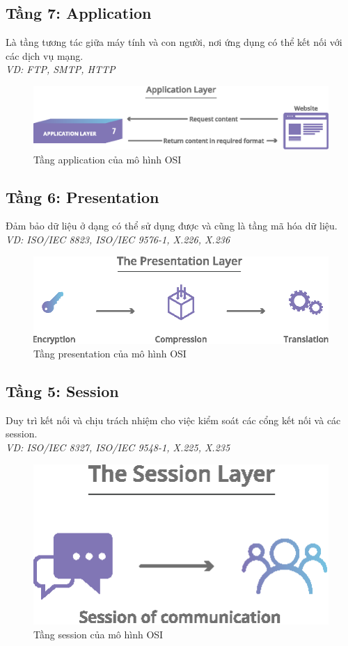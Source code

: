 \documentclass[9pt,twocolumn,twoside,lineno]{gsajnl}
\begin{document}
\subsection{Tầng 7: Application}
Là tầng tương tác giữa máy tính và con người, nơi ứng dụng có thể kết nối với các dịch vụ mạng. \\ \textit{VD: FTP, SMTP, HTTP}
\begin{figure}[h]
  \centering
  \includegraphics[scale=0.5]{q3_2}
  \caption{Tầng application của mô hình OSI}
\end{figure}

\subsection{Tầng 6: Presentation}
Đảm bảo dữ liệu ở dạng có thể sử dụng được và cũng là tầng mã hóa dữ liệu.\\ \textit{VD: ISO/IEC 8823, ISO/IEC 9576-1,  X.226, X.236}
\begin{figure}[h]
  \centering
  \includegraphics[scale=0.5]{q3_3}
  \caption{Tầng presentation của mô hình OSI}
\end{figure}

\subsection{Tầng 5: Session}
Duy trì kết nối và chịu trách nhiệm cho việc kiểm soát các cổng kết nối và các session.\\ \textit{VD: ISO/IEC 8327, ISO/IEC 9548-1, X.225, X.235}
\begin{figure}[H]
  \centering
  \includegraphics[scale=0.5]{q3_4}
  \caption{Tầng session của mô hình OSI}
\end{figure}
\end{document}
